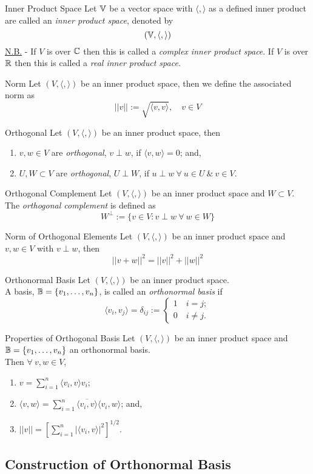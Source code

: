 \documentclass[11pt,a4paper]{article}
\begin{document}
\subtitle{Definition 9.03 - }{Inner Product Space}
Let $\mathbb{V}$ be a vector space with $\langle , \rangle$ as a defined inner product are called an \textit{inner product space}, denoted by
$$(\mathbb{V}, \langle , \rangle)$$
\underline{N.B.} - If $V$ is over $\mathbb{C}$ then this is called a \textit{complex inner product space}. If $V$ is over $\mathbb{R}$ then this is called a \textit{real inner product space}.\\

\subtitle{Definition 9.04 - }{Norm}
Let $( V , \langle , \rangle )$ be an inner product space, then we define the associated norm as
$$||v|| := \sqrt{\langle v, v \rangle},\quad v \in V$$

\subtitle{Definition 9.05 - }{Orthogonal}
Let $(V , \langle , \rangle)$ be an inner product space, then
\begin{enumerate}[label=\roman*)]
  \item $v, w \in V$ are \textit{orthogonal}, $v \perp w$, if $\langle v, w \rangle = 0$; and,
  \item $U, W \subset V$ are \textit{orthogonal}, $U \perp W$, if $u \perp w\ \forall\ u \in U\ \&\ v \in V$.
\end{enumerate}

\subtitle{Definition 9.06 - }{Orthogonal Complement}
Let $(V, \langle , \rangle)$ be an inner product space and $W \subset V$.\\
The \textit{orthogonal complement} is defined as
$$W^\perp := \{ v \in V : v \perp w\ \forall\ w \in W \}$$

\subtitle{Theorem 9.07 - }{Norm of Orthogonal Elements}
Let $(V, \langle , \rangle)$ be an inner product space and $v, w \in V$ with $v \perp w$, then
$$||v + w||^2 = ||v||^2 + ||w||^2$$

\subtitle{Definition 9.08 - }{Orthonormal Basis}
Let $(V, \langle , \rangle)$ be an inner product space.\\
A basis, $\mathbb{B} = \{ v_1 , \dots , v_n\}$, is called an \textit{orthonormal basis} if
$$\langle v_i , v_j \rangle = \delta_{ij} := \begin{cases} 1 \quad i = j;\\ 0 \quad i \not = j. \end{cases}$$

\subtitle{Theorem 9.09 - }{Properties of Orthogonal Basis}
Let $(V, \langle , \rangle)$ be an inner product space and $\mathbb{B} = \{ v_1 , \dots , v_n\}$ an orthonormal basis.\\
Then $\forall\ v, w \in V$,
\begin{enumerate}[label=\roman*)]
  \item $v = \sum_{i=1}^n \langle v_i , v \rangle v_i$;
  \item $\langle v , w \rangle = \sum_{i=1}^n \overline{\langle v_i, v \rangle}\langle v_i, w \rangle$; and,
  \item $||v|| = \left[\sum_{i=1}^n |\langle v_i, v \rangle|^2\right]^{1/2} $.
\end{enumerate}

\subsection{Construction of Orthonormal Basis}
\end{document}
